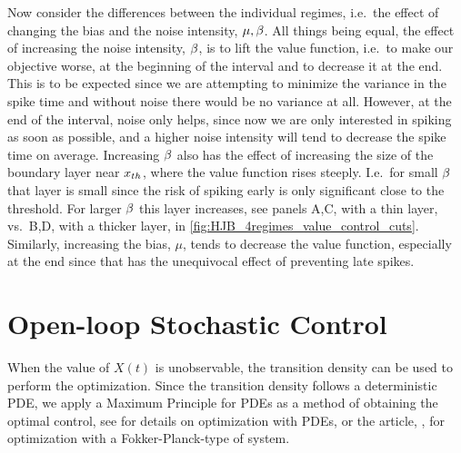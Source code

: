 \documentclass[12pt]{iopart}
\begin{document}
Now consider the differences between the individual regimes, i.e.\ the
effect of changing the bias and the noise intensity, ${\mu },{\beta}$. All things being
equal, the effect of increasing the noise intensity, ${\beta}$, is to lift the value
function, i.e.\ to make our objective worse, at the beginning of the interval
and to decrease it at the end. This is to be expected since we are attempting to
minimize the variance in the spike time and without noise there would be no
variance at all. However, at the end of the interval, noise only helps, since
now we are only interested in spiking as soon as possible, and a higher noise
intensity will tend to decrease the spike time on average. Increasing ${\beta}$ also
has the effect of increasing the size of the boundary layer near ${ x_{th} }$, where
the value function rises steeply. I.e.\ for small ${\beta}$ that layer is small since
the risk of spiking early is only significant close to the threshold. For larger
${\beta}$ this layer increases, see panels A,C, with a thin layer, vs.\ B,D, with a
thicker layer, in \cref{fig:HJB_4regimes_value_control_cuts}. Similarly,
increasing the bias, $\mu$, tends to decrease the value function, especially at
the end since that has the unequivocal effect of preventing late spikes.
 
 
\section{Open-loop Stochastic Control}
When the value of $X(t)$ is unobservable, the transition density can be used to
perform the optimization. Since the transition density follows a deterministic
PDE, we apply a Maximum Principle for PDEs as a method of obtaining the optimal
control, see \cite{Borzi2012} for details on optimization with PDEs, or the
article, \cite{Annunziato2010}, for optimization with a
Fokker-Planck-type of system.
\end{document}
